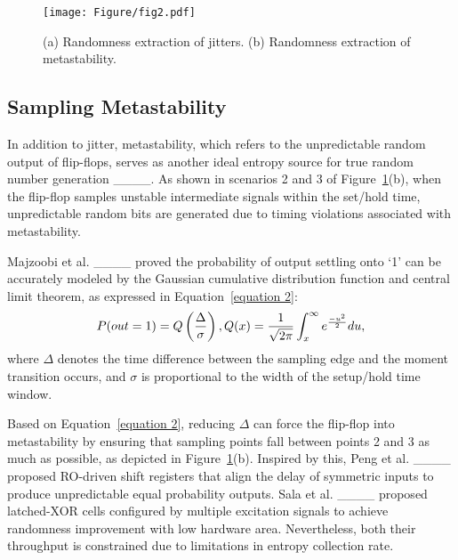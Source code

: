 \begin{figure}[htbp]
    \centering
    \texttt{[image: Figure/fig2.pdf]}
    \caption{(a) Randomness extraction of jitters. (b) Randomness extraction of metastability.}
    \label{Figure 2}
     \vspace{-10pt}
\end{figure}
 \subsection{Sampling Metastability}
In addition to jitter, metastability, which refers to the unpredictable random output of flip-flops, serves as another ideal entropy source for true random number generation ____. As shown in scenarios 2 and 3 of Figure~\ref{Figure 2}(b), when the flip-flop samples unstable intermediate signals within the set/hold time,  unpredictable random bits are generated due to timing violations associated with metastability. 

Majzoobi et al. ____ proved the probability of output settling onto ‘1’ can be accurately modeled by the Gaussian cumulative distribution function and central limit theorem, as expressed in Equation~\eqref{equation 2}: 
\begin{equation}
P(out=1)=Q\left ( \frac{\Delta  }{\sigma }  \right ) ,\\
Q(x)=\frac{1}{\sqrt{2\pi } }\int_{x}^{\infty } e^{\frac{-u^{2} }{2} } du ,
\label{equation 2}
\end{equation}
where $\Delta$ denotes the time difference between the 
sampling edge and the moment transition occurs, and $\sigma$ is proportional to the width of the setup/hold time window. 

Based on Equation~\eqref{equation 2}, reducing $\Delta$ can force the flip-flop into metastability by ensuring that sampling points fall between points 2 and 3 as much as possible, as depicted in Figure~\ref{Figure 2}(b). Inspired by this, Peng et al. ____ proposed RO-driven shift registers that align the delay of symmetric inputs to produce unpredictable equal probability outputs. Sala et al. ____ proposed latched-XOR cells configured by multiple excitation signals to achieve randomness improvement with low hardware area. Nevertheless, both their throughput is constrained due to limitations in entropy collection rate. 



